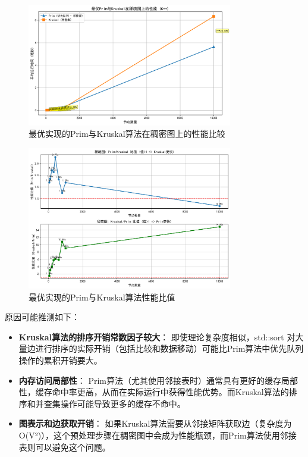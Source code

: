 \documentclass[a4paper,12pt]{ctexart}
\begin{document}
\begin{figure}[htbp]
    \centering
    \includegraphics[width=0.8\textwidth]{img/img_cpp1/optimal_sparse_comparison_cpp.png}
    \caption{最优实现的Prim与Kruskal算法在稠密图上的性能比较}
    \label{fig:optimal_dense}
\end{figure}

\begin{figure}[htbp]
    \centering
    \includegraphics[width=0.8\textwidth]{img/img_cpp1/theory_vs_actual_cpp.png}
    \caption{最优实现的Prim与Kruskal算法性能比值}
    \label{fig:optimal_dense}
\end{figure}

原因可能推测如下：
\begin{itemize}
    \item \textbf{Kruskal算法的排序开销常数因子较大}： 即使理论复杂度相似，std::sort 对大量边进行排序的实际开销（包括比较和数据移动）可能比Prim算法中优先队列操作的累积开销要大。
    \item \textbf{内存访问局部性}： Prim算法（尤其使用邻接表时）通常具有更好的缓存局部性，缓存命中率更高，从而在实际运行中获得性能优势。而Kruskal算法的排序和并查集操作可能导致更多的缓存不命中。
    \item \textbf{图表示和边获取开销}： 如果Kruskal算法需要从邻接矩阵获取边（复杂度为O(V²)），这个预处理步骤在稠密图中会成为性能瓶颈，而Prim算法使用邻接表则可以避免这个问题。
\end{itemize}
\end{document}
